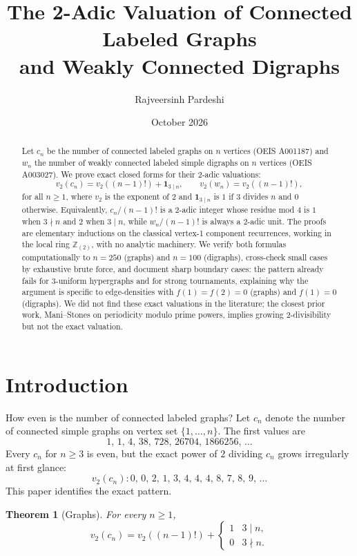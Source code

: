 \documentclass[11pt]{article}
\title{The 2-Adic Valuation of Connected Labeled Graphs\\ and Weakly Connected Digraphs}
\author{Rajveersinh Pardeshi}
\date{October 2026}
\newtheorem{theorem}{Theorem}[section]
\theoremstyle{definition}
\begin{document}
\maketitle

\begin{abstract}
Let $c_n$ be the number of connected labeled graphs on $n$ vertices
(OEIS A001187) and $w_n$ the number of weakly connected labeled simple
digraphs on $n$ vertices (OEIS A003027).
We prove exact closed forms for their 2-adic valuations:
\[
v_2(c_n) = v_2((n-1)!) + \mathbf{1}_{3 \mid n},
\qquad
v_2(w_n) = v_2((n-1)!),
\]
for all $n \ge 1$, where $v_2$ is the exponent of $2$ and
$\mathbf{1}_{3\mid n}$ is $1$ if $3$ divides $n$ and $0$ otherwise.
Equivalently, $c_n/(n-1)!$ is a $2$-adic integer whose residue mod $4$
is $1$ when $3 \nmid n$ and $2$ when $3 \mid n$, while
$w_n/(n-1)!$ is always a $2$-adic unit.
The proofs are elementary inductions on the classical
vertex-1 component recurrences, working in the local ring
$\mathbb{Z}_{(2)}$, with no analytic machinery.
We verify both formulas computationally to $n=250$ (graphs) and
$n=100$ (digraphs), cross-check small cases by exhaustive brute force,
and document sharp boundary cases: the pattern already fails for
$3$-uniform hypergraphs and for strong tournaments, explaining why
the argument is specific to edge-densities with $f(1)=f(2)=0$ (graphs)
and $f(1)=0$ (digraphs).
We did not find these exact valuations in the literature; the closest
prior work, Mani--Stones on periodicity modulo prime powers, implies
growing $2$-divisibility but not the exact valuation.
\end{abstract}

\section{Introduction}
How even is the number of connected labeled graphs?
Let $c_n$ denote the number of connected simple graphs on vertex set
$\{1,\dots,n\}$. The first values are
\[
1,\, 1,\, 4,\, 38,\, 728,\, 26704,\, 1866256,\, \dots
\]
Every $c_n$ for $n \ge 3$ is even, but the exact power of $2$ dividing
$c_n$ grows irregularly at first glance:
\[
v_2(c_n) : 0,\, 0,\, 2,\, 1,\, 3,\, 4,\, 4,\, 4,\, 8,\, 7,\, 8,\, 9,\, \dots
\]
This paper identifies the exact pattern.

\begin{theorem}[Graphs]\label{thm:graphs}
For every $n \ge 1$,
\begin{equation}\label{eq:graphs}
v_2(c_n) = v_2((n-1)!) + \begin{cases}1 & 3 \mid n, \\ 0 & 3 \nmid n.\end{cases}
\end{equation}
\end{theorem}
\end{document}
